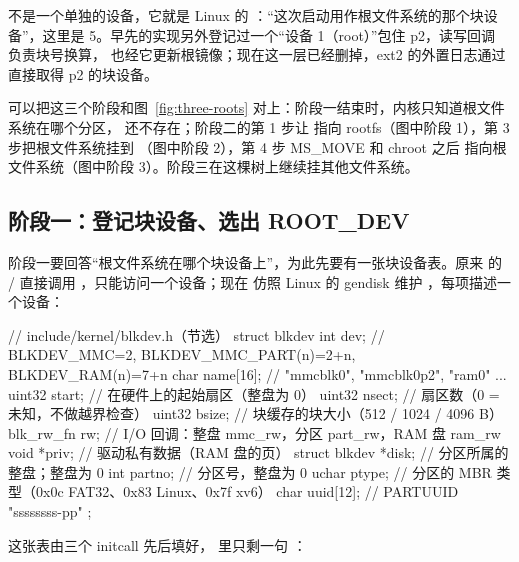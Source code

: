  不是一个单独的设备，它就是 Linux 的 ：“这次启动用作根文件系统的那个块设备”，这里是 5。早先的实现另外登记过一个“设备 1（root）”包住 p2，读写回调  负责块号换算， 也经它更新根镜像；现在这一层已经删掉，ext2 的外置日志通过  直接取得 p2 的块设备。

可以把这三个阶段和图~\ref{fig:three-roots} 对上：阶段一结束时，内核只知道根文件系统在哪个分区，\code{/} 还不存在；阶段二的第 1 步让 \code{/} 指向 rootfs（图中阶段 1），第 3 步把根文件系统挂到 （图中阶段 2），第 4 步 MS\_MOVE 和 chroot 之后 \code{/} 指向根文件系统（图中阶段 3）。阶段三在这棵树上继续挂其他文件系统。

\subsection{阶段一：登记块设备、选出 ROOT\_DEV}
\label{sec:ns-stage1}

阶段一要回答“根文件系统在哪个块设备上”，为此先要有一张块设备表。原来  的 / 直接调用 ，只能访问一个设备；现在  仿照 Linux 的 gendisk 维护 ，每项描述一个设备：

\begin{ccode}
// include/kernel/blkdev.h（节选）
struct blkdev {
  int      dev;      // BLKDEV_MMC=2, BLKDEV_MMC_PART(n)=2+n, BLKDEV_RAM(n)=7+n
  char     name[16]; // "mmcblk0", "mmcblk0p2", "ram0" ...
  uint32   start;    // 在硬件上的起始扇区（整盘为 0）
  uint32   nsect;    // 扇区数（0 = 未知，不做越界检查）
  uint32   bsize;    // 块缓存的块大小（512 / 1024 / 4096 B）
  blk_rw_fn rw;      // I/O 回调：整盘 mmc_rw，分区 part_rw，RAM 盘 ram_rw
  void     *priv;    // 驱动私有数据（RAM 盘的页）
  struct blkdev *disk;   // 分区所属的整盘；整盘为 0
  int      partno;   // 分区号，整盘为 0
  uchar    ptype;    // 分区的 MBR 类型（0x0c FAT32、0x83 Linux、0x7f xv6）
  char     uuid[12]; // PARTUUID "ssssssss-pp"
};
\end{ccode}

这张表由三个 initcall 先后填好， 里只剩一句 ：

